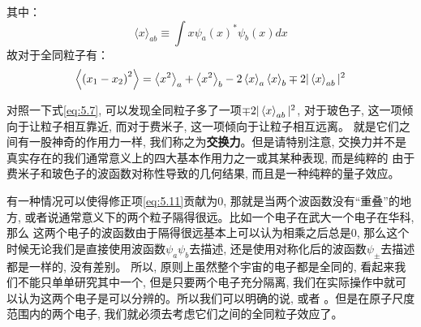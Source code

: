 其中：
\begin{equation}
    \label{eq:5.11}
    \langle x\rangle_{a b} \equiv \int x \psi_{a}(x)^{*} \psi_{b}(x) d x
\end{equation}
故对于全同粒子有：
\begin{equation}
    \Braket{\left(x_1-x_2\right)^2}=\Braket{x^2}_a+\Braket{x^2}_b-2\Braket{x}_a\Braket{x}_b\mp 2|\Braket{x}_{ab}|^2
\end{equation}

对照一下式\ref{eq:5.7}, 可以发现全同粒子多了一项$\mp 2|\Braket{x}_{ab}|^2$, 对于玻色子, 这一项倾向于让粒子相互靠近, 而对于费米子, 这一项倾向于让粒子相互远离。
就是它们之间有一股神奇的作用力一样, 我们称之为\textbf{交换力}。但是请特别注意, 交换力并不是真实存在的我们通常意义上的四大基本作用力之一或其某种表现, 而是纯粹的
由于费米子和玻色子的波函数对称性导致的几何结果, 而且是一种纯粹的量子效应。

有一种情况可以使得修正项\ref{eq:5.11}贡献为0, 那就是当两个波函数没有“重叠”的地方, 或者说通常意义下的两个粒子隔得很远。比如一个电子在武大一个电子在华科, 那么
这两个电子的波函数由于隔得很远基本上可以认为相乘之后总是0, 那么这个时候无论我们是直接使用波函数$\psi_a\psi_b$去描述, 还是使用对称化后的波函数$\psi_\pm$去描述都是一样的, 没有差别。
所以, 原则上虽然整个宇宙的电子都是全同的, 看起来我们不能只单单研究其中一个, 但是只要两个电子充分隔离, 我们在实际操作中就可以认为这两个电子是可以分辨的。所以我们可以明确的说, 或者
。但是在原子尺度范围内的两个电子, 我们就必须去考虑它们之间的全同粒子效应了。
